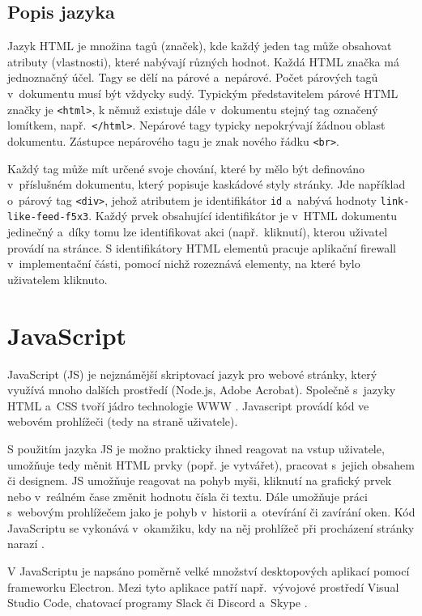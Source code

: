 \subsection*{Popis jazyka}
Jazyk HTML je množina tagů (značek), kde každý jeden tag může obsahovat atributy (vlastnosti), které nabývají různých hodnot. Každá HTML značka má jednoznačný účel. Tagy se dělí na párové a~nepárové. Počet párových tagů v~dokumentu musí být vždycky sudý. Typickým představitelem párové HTML značky je \texttt{<html>}, k němuž existuje dále v~dokumentu stejný tag označený lomítkem, např.~\texttt{</html>}. Nepárové tagy typicky nepokrývají žádnou oblast dokumentu. Zástupce nepárového tagu je znak nového řádku \texttt{<br>}.

Každý tag může mít určené svoje chování, které by mělo být definováno v~příslušném dokumentu, který popisuje kaskádové styly stránky. Jde například o~párový tag \texttt{<div>}, jehož atributem je identifikátor \texttt{id} a~nabývá hodnoty \texttt{link-like-feed-f5x3}. Každý prvek obsahující identifikátor je v~HTML dokumentu jedinečný a~díky tomu lze identifikovat akci (např.~kliknutí), kterou uživatel provádí na stránce. S identifikátory HTML elementů pracuje aplikační firewall v~implementační části, pomocí nichž rozeznává elementy, na které bylo uživatelem kliknuto.

\section{JavaScript}
JavaScript (JS) je nejznámější skriptovací jazyk pro webové stránky, který využívá mnoho dalších prostředí (Node.js, Adobe Acrobat). Společně s~jazyky HTML a~CSS tvoří jádro technologie WWW \cite{bib:js_html_css}. Javascript provádí kód ve webovém prohlížeči (tedy na straně uživatele).

S použitím jazyka JS je možno prakticky ihned reagovat na vstup uživatele, umožňuje tedy měnit HTML prvky (popř. je vytvářet), pracovat s~jejich obsahem či designem. JS umožňuje reagovat na pohyb myši, kliknutí na grafický prvek nebo v~reálném čase změnit hodnotu čísla či textu. Dále umožňuje práci s~webovým prohlížečem jako je pohyb v~historii a~otevírání či zavírání oken. Kód JavaScriptu se vykonává v~okamžiku, kdy na něj prohlížeč při procházení stránky narazí \cite{bib:IIS_JS}.

V JavaScriptu je napsáno poměrně velké množství desktopových aplikací pomocí frameworku Electron. Mezi tyto aplikace patří např.~vývojové prostředí Visual Studio Code, chatovací programy Slack či Discord a~Skype \cite{bib:electron}.

